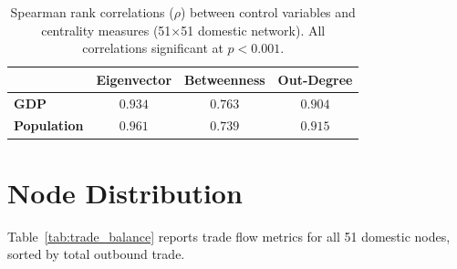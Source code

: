 \documentclass[12pt,oneside]{book}
\begin{document}
\begin{table}[ht]
\centering
\caption[Spearman rank correlations ($\rho$) between control variables and centrality measures.]{Spearman rank correlations ($\rho$) between control variables and centrality measures (51$\times$51 domestic network). All correlations significant at $p < 0.001$.}
\label{tab:rho_correlations}
\begin{tabular}{l c c c}
\hline
& \textbf{Eigenvector} & \textbf{Betweenness} & \textbf{Out-Degree} \\
\hline
\textbf{GDP} & $0.934$ & $0.763$ & $0.904$ \\
\textbf{Population} & $0.961$ & $0.739$ & $0.915$ \\
\hline
\end{tabular}
\end{table}

\FloatBarrier

\chapter{Node Distribution}
\label{appendix:node_distribution}

Table~\ref{tab:trade_balance} reports trade flow metrics for all 51 domestic nodes, sorted by total outbound trade.
\end{document}

